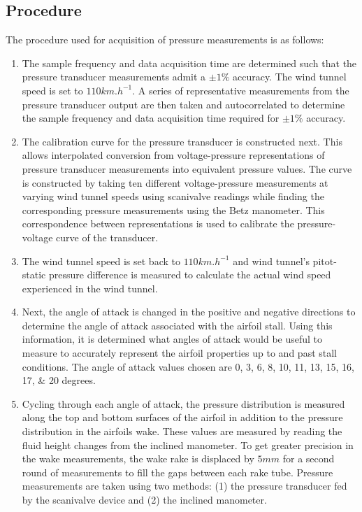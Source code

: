 \documentclass[runningheads]{llncs}
\begin{document}
\subsection{Procedure}\label{sec:procedure}


\noindent
The procedure used for acquisition of pressure measurements is as follows:

\begin{enumerate}

    \item The sample frequency and data acquisition time are determined such that the pressure transducer measurements admit a $\pm 1\%$ accuracy. The wind tunnel speed is set to $110\si{km.h^{-1}}$. A series of representative measurements from the pressure transducer output are then taken and autocorrelated to determine the sample frequency and data acquisition time required for $\pm 1\%$ accuracy.
    
    \item The calibration curve for the pressure transducer is constructed next. This allows interpolated conversion from voltage-pressure representations of pressure transducer measurements into equivalent pressure values. The curve is constructed by taking ten different voltage-pressure measurements at varying wind tunnel speeds using scanivalve readings while finding the corresponding pressure measurements using the Betz manometer. This correspondence between representations is used to calibrate the pressure-voltage curve of the transducer.
    
    \item The wind tunnel speed is set back to $110\si{km.h^{-1}}$ and wind tunnel's pitot-static pressure difference is measured to calculate the actual wind speed experienced in the wind tunnel.
    
    \item Next, the angle of attack is changed in the positive and negative directions to determine the angle of attack associated with the airfoil stall. Using this information, it is determined what angles of attack would be useful to measure to accurately represent the airfoil properties up to and past stall conditions. The angle of attack values chosen are \numlist{0;3;6;8;10;11;13;15;16;17;20} degrees.

    \item Cycling through each angle of attack, the pressure distribution is measured along the top and bottom surfaces of the airfoil in addition to the pressure distribution in the airfoils wake. These values are measured by reading the fluid height changes from the inclined manometer. To get greater precision in the wake measurements, the wake rake is displaced by $5\si{mm}$ for a second round of measurements to fill the gaps between each rake tube. Pressure measurements are taken using two methods: (1) the pressure transducer fed by the scanivalve device and (2) the inclined manometer.

\end{enumerate}
\end{document}
